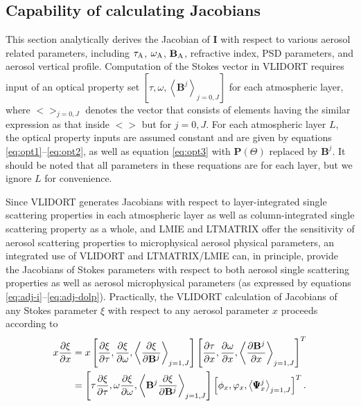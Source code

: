\subsection{Capability of calculating Jacobians} \label{subsec:jacobian}

This section analytically derives the Jacobian of $\mathbf{I}$ with
respect to various aerosol related parameters, including $\tau_\text{A}$,
$\omega_\text{A}$, $\mathbf{B}_\text{A}$, refractive index, PSD parameters, and aerosol vertical
profile. Computation of the Stokes vector in VLIDORT requires input of
an optical property set $[\tau,\omega,\left<\mathbf{B}^j\right>_{j=0,J}]$ for
each atmospheric layer, where $<>_{j=0,J}$ denotes the vector that
consists of elements having the similar expression as that inside $<>$
but for $j=0, J$. For each atmospheric layer $L$, the optical property
inputs are assumed constant and are given by equations 
\eqref{eq:opt1}--\eqref{eq:opt2}, as well as equation \eqref{eq:opt3}
with $\mathbf{P}(\Theta)$ replaced by $\mathbf{B}^j$. 
It should be noted that all parameters
in these requations are for each layer, but we ignore $L$ for
convenience.

Since VLIDORT generates Jacobians with respect to layer-integrated
single scattering properties in each atmospheric layer as well as
column-integrated single scattering property as a whole, and LMIE and
LTMATRIX offer the sensitivity of aerosol scattering properties to
microphysical aerosol physical parameters, an integrated use of VLIDORT
and LTMATRIX/LMIE can, in principle, provide the Jacobians of Stokes
parameters with respect to both aerosol single scattering properties as
well as aerosol microphysical parameters (as expressed by equations
\eqref{eq:adj-i}--\eqref{eq:adj-dolp}). Practically, the VLIDORT
calculation of Jacobians of any Stokes parameter $\xi$ with respect to 
any aerosol parameter $x$ proceeds according to
\begin{equation}
\begin{split}
x\frac{\partial\xi}{\partial x} &=
  x\left[ \frac{\partial\xi}{\partial\tau}, \frac{\partial\xi}{\partial\omega}, 
          \left< \frac{\partial\xi}{\partial\mathbf{B}^j}\right>_{j=1,J}\right] 
  \left[ \frac{\partial\tau}{\partial x}, \frac{\partial\omega}{\partial x}, 
         \left< \frac{\partial\mathbf{B}^j}{\partial x}\right>_{j=1,J}\right]^T \\
  &= \left[ \tau \frac{\partial\xi}{\partial\tau}, \omega \frac{\partial\xi}{\partial\omega}, 
          \left< \mathbf{B}^j \frac{\partial\xi}{\partial\mathbf{B}^j}\right>_{j=1,J}\right]
     \left[ \phi_x, \varphi_x, \left< \pmb{\Psi}_x^j\right>_{j=1,J}
\right]^T. 
\end{split}
\label{eq:adj-x}
\end{equation}

